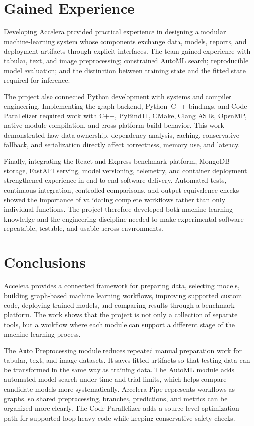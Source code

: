 \documentclass[12pt,a4paper]{report}
\begin{document}
\section{Gained Experience}
Developing Accelera provided practical experience in designing a modular
machine-learning system whose components exchange data, models, reports, and
deployment artifacts through explicit interfaces. The team gained experience
with tabular, text, and image preprocessing; constrained AutoML search;
reproducible model evaluation; and the distinction between training state and
the fitted state required for inference.

\noindent The project also connected Python development with systems and
compiler engineering. Implementing the graph backend, Python--C++ bindings,
and Code Parallelizer required work with C++, PyBind11, CMake, Clang ASTs,
OpenMP, native-module compilation, and cross-platform build behavior. This work
demonstrated how data ownership, dependency analysis, caching, conservative
fallback, and serialization directly affect correctness, memory use, and
latency.

\noindent Finally, integrating the React and Express benchmark platform,
MongoDB storage, FastAPI serving, model versioning, telemetry, and container
deployment strengthened experience in end-to-end software delivery. Automated
tests, continuous integration, controlled comparisons, and output-equivalence
checks showed the importance of validating complete workflows rather than only
individual functions. The project therefore developed both machine-learning
knowledge and the engineering discipline needed to make experimental software
repeatable, testable, and usable across environments.

\section{Conclusions}
Accelera provides a connected framework for preparing data, selecting models,
building graph-based machine learning workflows, improving supported custom
code, deploying trained models, and comparing results through a benchmark
platform. The work shows that the project is not only a collection of separate
tools, but a workflow where each module can support a different stage of the
machine learning process.

\noindent The Auto Preprocessing module reduces repeated manual preparation work
for tabular, text, and image datasets. It saves fitted artifacts so that testing
data can be transformed in the same way as training data. The AutoML module
adds automated model search under time and trial limits, which helps compare
candidate models more systematically. Accelera Pipe represents workflows as
graphs, so shared preprocessing, branches, predictions, and metrics can be
organized more clearly. The Code Parallelizer adds a source-level optimization
path for supported loop-heavy code while keeping conservative safety checks.
\end{document}
